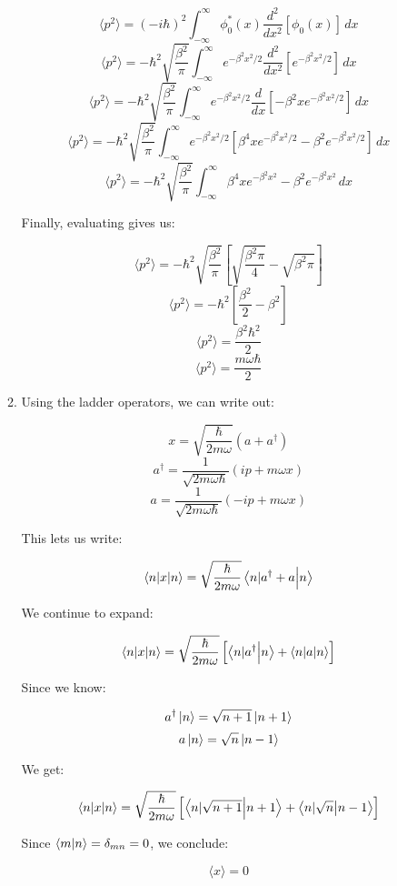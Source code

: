 \begin{enumerate}
\begin{enumerate}
        $$\langle p^2\rangle=(-i\hbar)^2\int_{-\infty}^{\infty} \phi_0^*(x)\frac{d^2}{dx^2}\left[ \phi_0(x) \right]\,dx$$
        $$\langle p^2\rangle=-\hbar^2\sqrt{\frac{\beta^2}{\pi}}\int_{-\infty}^{\infty} e^{-\beta^2x^2/2}\frac{d^2}{dx^2}\left[ e^{-\beta^2x^2/2} \right]\,dx$$
        $$\langle p^2\rangle=-\hbar^2\sqrt{\frac{\beta^2}{\pi}}\int_{-\infty}^{\infty} e^{-\beta^2x^2/2}\frac{d}{dx}\left[ -\beta^2xe^{-\beta^2x^2/2} \right]\,dx$$
        $$\langle p^2\rangle=-\hbar^2\sqrt{\frac{\beta^2}{\pi}}\int_{-\infty}^{\infty} e^{-\beta^2x^2/2}\left[ \beta^4xe^{-\beta^2x^2/2}-\beta^2e^{-\beta^2x^2/2} \right]\,dx$$
        $$\langle p^2\rangle=-\hbar^2\sqrt{\frac{\beta^2}{\pi}}\int_{-\infty}^{\infty}  \beta^4xe^{-\beta^2x^2}-\beta^2e^{-\beta^2x^2}\,dx$$

        Finally, evaluating gives us:

        $$\langle p^2\rangle=-\hbar^2\sqrt{\frac{\beta^2}{\pi}}\left[ \sqrt{\frac{\beta^2\pi}{4}}-\sqrt{\beta^2\pi} \right]$$
        $$\langle p^2\rangle=-\hbar^2\left[ \frac{\beta^2}{2}-\beta^2 \right]$$
        $$\langle p^2\rangle=\frac{\beta^2\hbar^2}{2}$$
        $$\boxed{\langle p^2\rangle=\frac{m\omega\hbar}{2}}$$

      \item Using the ladder operators, we can write out:

        $$x=\sqrt{\frac{\hbar}{2m\omega}}(a+a^{\dagger})$$
        $$a^{\dagger}=\frac{1}{\sqrt{2m\omega\hbar}}(ip+m\omega x)$$
        $$a=\frac{1}{\sqrt{2m\omega\hbar}}(-ip+m\omega x)$$

        This lets us write:

        $$\bra{n|x}\ket{n}=\sqrt{\frac{\hbar}{2m\omega}}\bra{n|a^{\dagger}+a}\ket{n}$$

        We continue to expand:

        $$\bra{n|x}\ket{n}=\sqrt{\frac{\hbar}{2m\omega}}\left[\bra{n|a^{\dagger}}\ket{n}+\bra{n|a}\ket{n}\right]$$

        Since we know:

        $$a^{\dagger}\ket{n}=\sqrt{n+1}\ket{n+1}$$
        $$a\ket{n}=\sqrt{n}\ket{n-1}$$

        We get:

        $$\bra{n|x}\ket{n}=\sqrt{\frac{\hbar}{2m\omega}}\left[\bra{n|\sqrt{n+1}}\ket{n+1}+\bra{n|\sqrt{n}}\ket{n-1}\right]$$

        Since $\bra{m}\ket{n}=\delta_{mn}=0$, we conclude:

        $$\boxed{\langle x\rangle=0}$$


\end{enumerate}
\end{enumerate}
